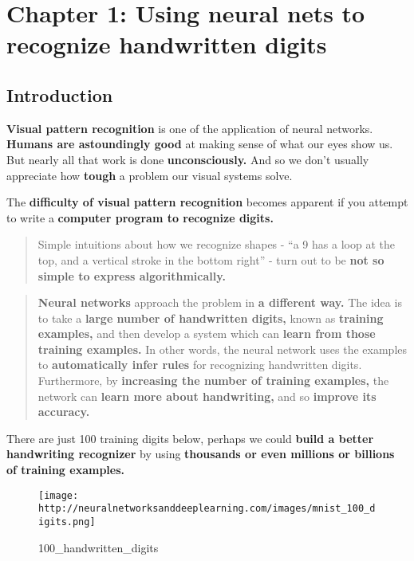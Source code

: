 \documentclass[]{article}
\author{}
\date{}
\begin{document}
{
\hypersetup{linkcolor=black}
\setcounter{tocdepth}{3}
\tableofcontents
}
\section{Chapter 1: Using neural nets to recognize handwritten
digits}\label{chapter-1-using-neural-nets-to-recognize-handwritten-digits}

\subsection{Introduction}\label{introduction}

\textbf{Visual pattern recognition} is one of the application of neural
networks. \textbf{Humans are astoundingly good} at making sense of what
our eyes show us. But nearly all that work is done
\textbf{unconsciously.} And so we don't usually appreciate how
\textbf{tough} a problem our visual systems solve.

The \textbf{difficulty of visual pattern recognition} becomes apparent
if you attempt to write a \textbf{computer program to recognize digits.}

\begin{quote}
Simple intuitions about how we recognize shapes - ``a 9 has a loop at
the top, and a vertical stroke in the bottom right'' - turn out to be
\textbf{not so simple to express algorithmically.}
\end{quote}

\begin{quote}
\textbf{Neural networks} approach the problem in \textbf{a different
way.} The idea is to take a \textbf{large number of handwritten digits,}
known as \textbf{training examples,} and then develop a system which can
\textbf{learn from those training examples.} In other words, the neural
network uses the examples to \textbf{automatically infer rules} for
recognizing handwritten digits. Furthermore, by \textbf{increasing the
number of training examples,} the network can \textbf{learn more about
handwriting,} and so \textbf{improve its accuracy.}
\end{quote}

There are just 100 training digits below, perhaps we could \textbf{build
a better handwriting recognizer} by using \textbf{thousands or even
millions or billions of training examples.}

\begin{figure}[htbp]
\centering
\texttt{[image: http://neuralnetworksanddeeplearning.com/images/mnist\_100\_digits.png]}
\caption{100\_handwritten\_digits}
\end{figure}
\end{document}
